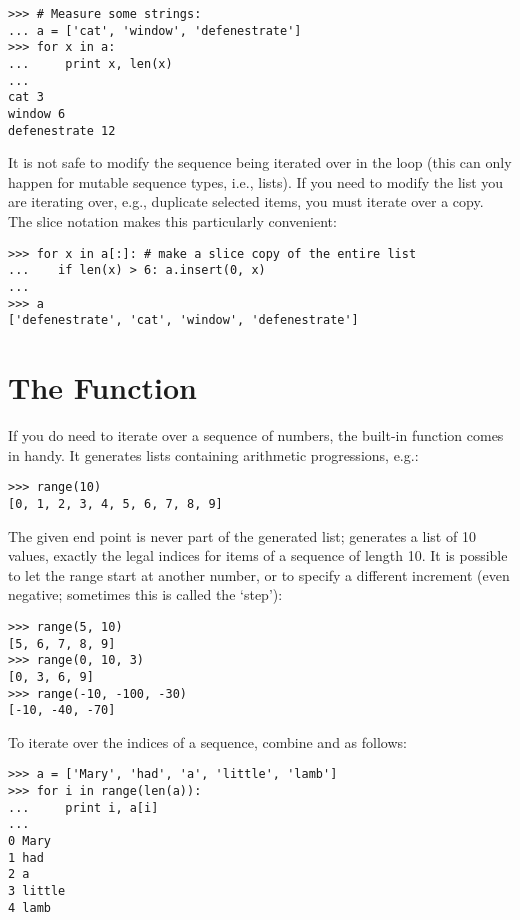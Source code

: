 \documentclass{manual}
\begin{document}
\begin{verbatim}
>>> # Measure some strings:
... a = ['cat', 'window', 'defenestrate']
>>> for x in a:
...     print x, len(x)
... 
cat 3
window 6
defenestrate 12
\end{verbatim}

It is not safe to modify the sequence being iterated over in the loop
(this can only happen for mutable sequence types, i.e., lists).  If
you need to modify the list you are iterating over, e.g., duplicate
selected items, you must iterate over a copy.  The slice notation
makes this particularly convenient:

\begin{verbatim}
>>> for x in a[:]: # make a slice copy of the entire list
...    if len(x) > 6: a.insert(0, x)
... 
>>> a
['defenestrate', 'cat', 'window', 'defenestrate']
\end{verbatim}


\section{The  Function \label{range}}

If you do need to iterate over a sequence of numbers, the built-in
function  comes in handy.  It generates lists
containing arithmetic progressions, e.g.:

\begin{verbatim}
>>> range(10)
[0, 1, 2, 3, 4, 5, 6, 7, 8, 9]
\end{verbatim}

The given end point is never part of the generated list;
 generates a list of 10 values, exactly the legal
indices for items of a sequence of length 10.  It is possible to let
the range start at another number, or to specify a different increment
(even negative; sometimes this is called the `step'):

\begin{verbatim}
>>> range(5, 10)
[5, 6, 7, 8, 9]
>>> range(0, 10, 3)
[0, 3, 6, 9]
>>> range(-10, -100, -30)
[-10, -40, -70]
\end{verbatim}

To iterate over the indices of a sequence, combine
 and  as follows:

\begin{verbatim}
>>> a = ['Mary', 'had', 'a', 'little', 'lamb']
>>> for i in range(len(a)):
...     print i, a[i]
... 
0 Mary
1 had
2 a
3 little
4 lamb
\end{verbatim}
\end{document}
